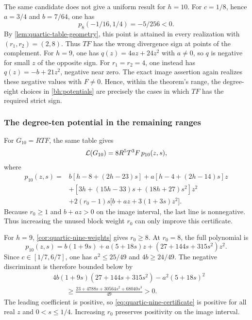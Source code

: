 The same candidate does not give a uniform result for $h=10$.
For $c=1/8$, hence $a=3/4$ and $b=7/64$, one has
\begin{equation}\label{eq:quartic-degree-eight-obstruction}
 p_8(-1/16,1/4)=-5/256<0.
\end{equation}
By \cref{lem:quartic-table-geometry}, this point is attained in every
realization with $(r_1,r_2)=(2,8)$. Thus $TF$ has the wrong divergence
sign at points of the complement. For $h=9$, one has
$q(z)=4az+24z^2$ with $a\ne0$, so $q$ is negative for small $z$ of
the opposite sign. For $r_1=r_2=4$, one instead has
$q(z)=-b+21z^2$, negative near zero. The exact image assertion again
realizes these negative values with $F\ne0$. Hence, within the
theorem's range, the degree-eight choices in \eqref{bh:potentials}
are precisely the cases in which $TF$ has the required strict sign.

\subsubsection{The degree-ten potential in the remaining ranges}

For $G_{10}=RTF$, the same table gives
\begin{equation}\label{bh:G10}
 \mathcal L(G_{10})=8R^5T^3F\,p_{10}(z,s),
\end{equation}
where
\begin{align}
 p_{10}(z,s)={}&b[h-8+(2h-23)s]
       +a[h-4+(2h-14)s]z\nonumber\\
       &+[3h+(15h-33)s+(18h+27)s^2]z^2\nonumber\\
       &+2(r_0-1)s\bigl[b+az+3(1+3s)z^2\bigr].
       \label{bh:p10}
\end{align}
Because $r_0\geq1$ and $b+az>0$ on the image interval, the last
line is nonnegative.  Thus increasing the unused block weight
$r_0$ can only improve this certificate.

For $h=9$, \cref{cor:quartic-nine-weights} gives $r_0\geq8$.
At $r_0=8$, the full polynomial is
\begin{equation}\label{eq:quartic-nine-certificate}
 p_{10}(z,s)=b(1+9s)+a(5+18s)z+
 (27+144s+315s^2)z^2.
\end{equation}
Since $c\in[1/7,6/7]$, one has $a^2\leq25/49$ and
$4b\geq24/49$. The negative discriminant is therefore bounded below by
\begin{align}
 &4b(1+9s)(27+144s+315s^2)-a^2(5+18s)^2\nonumber\\
 &\qquad\geq
 \frac{23+4788s+30564s^2+68040s^3}{49}>0.
 \label{eq:quartic-nine-discriminant}
\end{align}
The leading coefficient is positive, so \eqref{eq:quartic-nine-certificate}
is positive for all real $z$ and $0<s\leq1/4$. Increasing $r_0$
preserves positivity on the image interval.

